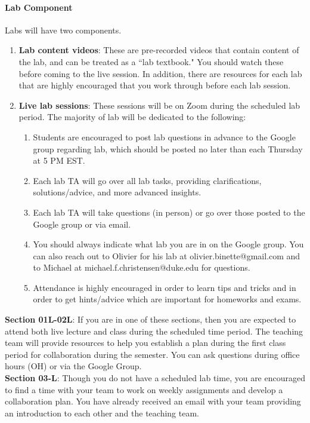 \documentclass[11pt]{article}
\begin{document}
\paragraph{Lab Component}
Labs will have two components. 
\begin{enumerate}
\item \textbf{Lab content videos}: These are pre-recorded videos that contain content of the lab, and can be treated as a ``lab textbook." You should watch these before coming to the live session. In addition, there are resources for each lab that are highly encouraged that you work through before each lab session. 
\item \textbf{Live lab sessions}: These sessions will be on Zoom during the scheduled lab period. The majority of lab will be dedicated to the following:
\begin{enumerate}
\item  Students are encouraged to post lab questions in advance to the Google group regarding lab, which should be posted no later than each Thursday at 5 PM EST. 
\item Each lab TA will go over all lab tasks, providing clarifications, solutions/advice, and more advanced insights. 
\item  Each lab TA will take questions (in person) or go over those posted to the Google group or via email. 
\item You should always indicate what lab you are in on the Google group. You can also reach out to Olivier for his lab at olivier.binette@gmail.com and to Michael at michael.f.christensen@duke.edu for questions. 
\item Attendance is highly encouraged in order to learn tips and tricks and in order to get hints/advice which are important for homeworks and exams.
\end{enumerate} 
\end{enumerate}

\textbf{Section 01L-02L}: If you are in one of these sections, then you are expected to attend both live lecture and class during the scheduled time period. The teaching team will provide resources to help you establish a plan during the first class period for collaboration during the semester. You can ask questions during office hours (OH) or via the Google Group. \\

\textbf{Section 03-L}: Though you do not have a scheduled lab time, you are encouraged to find a time with your team to work on weekly assignments and develop a collaboration plan. You have already received an email with your team providing an introduction to each other and the teaching team. 
\end{document}
